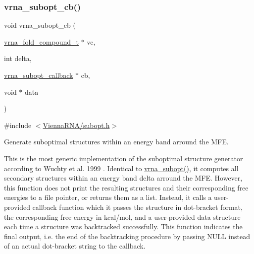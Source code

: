 \subsubsection{\texorpdfstring{vrna\_subopt\_cb()}{vrna\_subopt\_cb()}}
{\footnotesize\ttfamily void vrna\+\_\+subopt\+\_\+cb (\begin{DoxyParamCaption}\item[{\mbox{\hyperlink{group__fold__compound_ga1b0cef17fd40466cef5968eaeeff6166}{vrna\+\_\+fold\+\_\+compound\+\_\+t}} $\ast$}]{vc,  }\item[{int}]{delta,  }\item[{\mbox{\hyperlink{group__subopt__wuchty_gaa0270c66d04f59e750401695b8282e04}{vrna\+\_\+subopt\+\_\+callback}} $\ast$}]{cb,  }\item[{void $\ast$}]{data }\end{DoxyParamCaption})}



{\ttfamily \#include $<$\mbox{\hyperlink{subopt_8h}{Vienna\+R\+N\+A/subopt.\+h}}$>$}



Generate suboptimal structures within an energy band arround the M\+FE. 

This is the most generic implementation of the suboptimal structure generator according to Wuchty et al. 1999 \cite{wuchty:1999}. Identical to \mbox{\hyperlink{group__subopt__wuchty_ga0f11d738fb8c8b1885a90c11c8931ff6}{vrna\+\_\+subopt()}}, it computes all secondary structures within an energy band {\ttfamily delta} arround the M\+FE. However, this function does not print the resulting structures and their corresponding free energies to a file pointer, or returns them as a list. Instead, it calls a user-\/provided callback function which it passes the structure in dot-\/bracket format, the corresponding free energy in kcal/mol, and a user-\/provided data structure each time a structure was backtracked successfully. This function indicates the final output, i.\+e. the end of the backtracking procedure by passing N\+U\+LL instead of an actual dot-\/bracket string to the callback.

